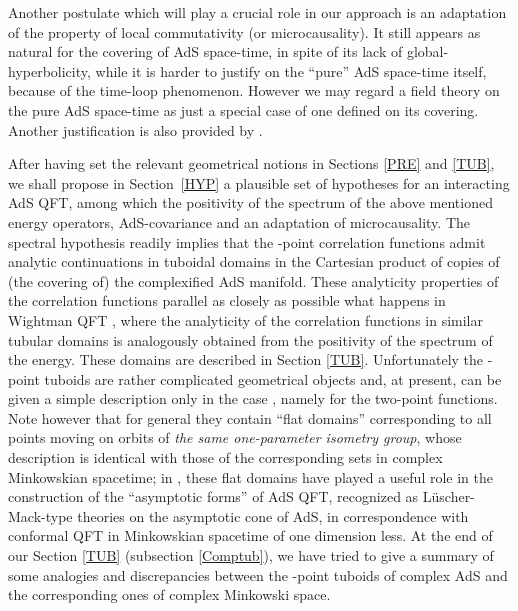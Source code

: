 \documentclass[a4paper,a4paper]{article}
\begin{document}
Another postulate which will play a crucial role in our approach is
an adaptation of the property of local commutativity (or microcausality).
It still appears as natural for
the covering of AdS space-time,
in spite of its lack of global-hyperbolicity,
while it is harder
to justify on the ``pure'' AdS space-time itself, because of the time-loop
phenomenon. However we may
regard a field theory on the pure AdS space-time as just a special case of
one defined on its covering. Another justification is also
provided by \cite{BFS}.


After having set the relevant geometrical notions in Sections
\ref{PRE} and \ref{TUB}, we shall propose in
Section~\ref{HYP} a plausible set of hypotheses
for an interacting AdS QFT, among which the positivity
of the spectrum of the above mentioned energy
operators, AdS-covariance and an adaptation of
microcausality.
The spectral hypothesis
readily implies that
the \coordHE{}-point correlation functions admit
analytic continuations in tuboidal
domains in the Cartesian product of \coordHE{} copies of
(the covering of) the complexified AdS manifold.
These analyticity properties of the correlation functions
parallel as closely as possible
what happens in Wightman QFT \cite{SW}, where the analyticity of the
correlation functions in similar tubular domains is analogously
obtained from the positivity of the spectrum of the energy.
These domains are described in Section \ref{TUB}.
Unfortunately the \coordHE{}-point tuboids are rather complicated
geometrical objects and, at present, can be given a simple description
only in the case \coordHE{}, namely for the two-point functions.
Note however that for general \coordHE{} they contain
``flat domains'' corresponding to all points moving on orbits of {\sl the
same one-parameter isometry group}, whose description is
identical with those of the corresponding
sets in complex Minkowskian spacetime;
in \cite{BBMS}, these flat domains have played a useful
role in the construction of the ``asymptotic forms'' of AdS QFT,
recognized as L\"uscher-Mack-type theories \cite{LM}
on the
asymptotic cone of AdS, in correspondence with conformal QFT
in Minkowskian spacetime of one dimension less.
At the end of our Section \ref{TUB} (subsection \ref{Comptub}), we have
tried to give a summary
of some analogies and discrepancies  between the \coordHE{}-point tuboids
of complex AdS and the corresponding ones of complex Minkowski
space.
\end{document}
